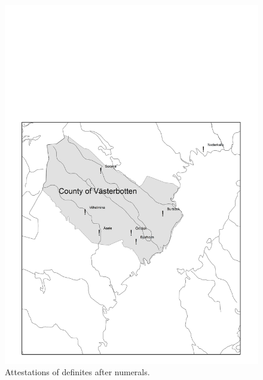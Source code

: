 \begin{figure}[h]
\includegraphics[height=.5\textheight]{figures/16_AttestationsofDefinitesNumerals}
\caption{Attestations of definites after numerals.}
\label{map:13}

\end{figure}

